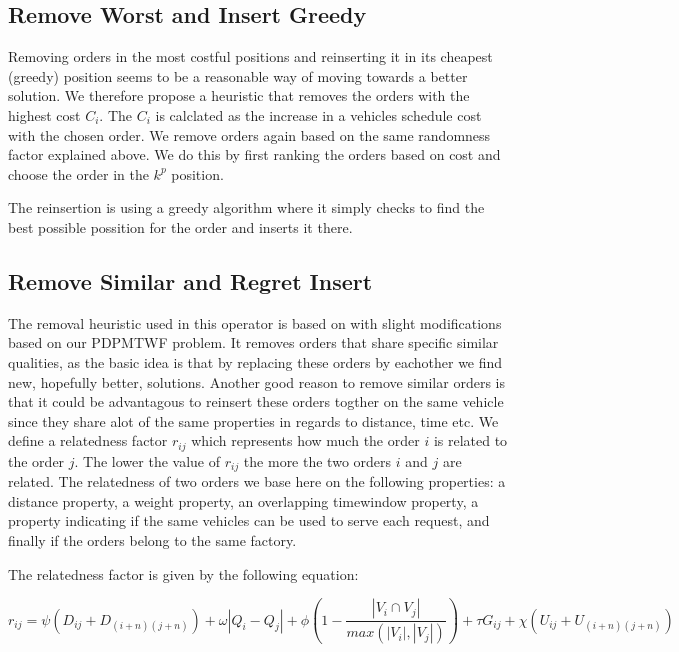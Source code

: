 \documentclass[../main.tex]{subfiles}
\begin{document}
\subsection{Remove Worst and Insert Greedy}
\label{sec:greedy}
Removing orders in the most costful positions and reinserting it in its cheapest (greedy) position seems to be a reasonable way of moving towards a better solution.
We therefore propose a heuristic that removes the orders with the highest cost $C_{i}$.
The $C_i$ is calclated as the increase in a vehicles schedule cost with the chosen order.
We remove orders again based on the same randomness factor explained above. We do this by first ranking the orders based on cost and choose the order in the $k^p$ position. \newline \par
The reinsertion is using a greedy algorithm where it simply checks to find the best possible possition for the order and inserts it there. 
\newline 
\subsection{Remove Similar and Regret Insert}
\label{sec:shaw}
The removal heuristic used in this operator is based on \citet{shaw97} with slight modifications based on our PDPMTWF problem. 
It removes orders that share specific similar qualities, as the basic idea is that by replacing these orders by eachother we find new, hopefully better, solutions. 
Another good reason to remove similar orders is that it could be advantagous to reinsert these orders togther on the same vehicle since they share alot of the same properties in regards to distance, time etc.
We define a relatedness factor $r_{ij}$ which represents how much the order $i$ is related to the order $j$. 
The lower the value of $r_{ij}$ the more the two orders $i$ and $j$ are related.
The relatedness of two orders we base here on the following properties: 
a distance property, a weight property, an overlapping timewindow property, a property indicating if the same vehicles can be used to serve each request, and finally if the orders belong to the same factory.

The relatedness factor is given by the following equation:

\begin{equation}
\label{relatedness}
    r_{ij} = \psi ( D_{i j} + D_{(i+n)(j+n)}) + \omega|Q_i - Q_j|
    + \phi (1-\dfrac{|V_i\cap V_j|}{max(|V_i|, |V_j|)} ) + \tau G_{ij} + \chi (U_{ij} + U_{(i+n)(j+n)})
\end{equation}
\end{document}
